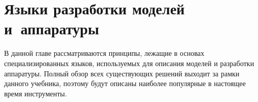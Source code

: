 \chapter{Языки разработки моделей и~аппаратуры}\label{chapter12}


В данной главе рассматриваются принципы, лежащие в основах специализированных языков, используемых для описания моделей и разработки аппаратуры. Полный обзор всех существующих решений выходит за рамки данного учебника, поэтому будут описаны наиболее популярные в настоящее время инструменты.
 
